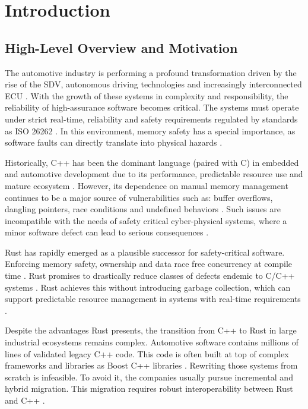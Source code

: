 % 
\chapter{Introduction} %
\label{chap:Chapter1} %


%
\section{High-Level Overview and Motivation} 
\label{sec:high_level_overview} 
The automotive industry is performing a profound transformation driven by the rise of the \gls{SDV}, 
autonomous driving technologies and increasingly interconnected \gls{ECU} \parencite{spglobalsdv}. 
With the growth of these systems in complexity and responsibility, the reliability of high-assurance software becomes critical. 
The systems must operate under strict real-time, reliability and safety requirements regulated by standards as ISO 26262 \parencite{deloittesdvreadiness}. 
In this environment, memory safety has a special importance, as software faults can directly translate into physical hazards \parencite{adacore_nsa_cisa_msl}.

Historically, C++ has been the dominant language (paired with C) in embedded and automotive development due to its performance, 
predictable resource use and mature ecosystem \parencite{ISO26262_Part6}. 
However, its dependence on manual memory management continues to be a major source of vulnerabilities such as: 
buffer overflows, dangling pointers, race conditions and undefined behaviors \parencite{MISRACpp2023}. 
Such issues are incompatible with the needs of safety critical cyber-physical systems, 
where a minor software defect can lead to serious consequences \parencite{AUTOSAR_Adaptive}.

Rust has rapidly emerged as a plausible successor for safety-critical software. 
Enforcing memory safety, ownership and data race free concurrency at compile time \parencite{docs_rs}. 
Rust promises to drastically reduce classes of defects endemic to C/C++ systems \parencite{ProgrammingRust}. 
Rust achieves this without introducing garbage collection, which can support predictable resource management in systems with real-time requirements \parencite{docs_rs}.

Despite the advantages Rust presents, the transition from C++ to Rust in large industrial ecosystems remains complex. 
Automotive software contains millions of lines of validated legacy C++ code. 
This code is often built at top of complex frameworks and libraries as Boost C++ libraries \parencite{CXX_Crate}. 
Rewriting those systems from scratch is infeasible. To avoid it, the companies usually pursue incremental and hybrid migration. 
This migration requires robust interoperability between Rust and C++ \parencite{Google_Rust_Interop}.


